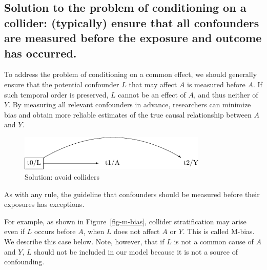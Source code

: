 \documentclass[
  singlecolumn]{report}
\begin{document}
\hypertarget{solution-to-the-problem-of-conditioning-on-a-collider-typically-ensure-that-all-confounders-are-measured-before-the-exposure-and-outcome-has-occurred.}{%
\subsection{Solution to the problem of conditioning on a collider:
(typically) ensure that all confounders are measured before the exposure
and outcome has
occurred.}\label{solution-to-the-problem-of-conditioning-on-a-collider-typically-ensure-that-all-confounders-are-measured-before-the-exposure-and-outcome-has-occurred.}}

To address the problem of conditioning on a common effect, we should
generally ensure that the potential confounder \(L\) that may affect
\(A\) is measured before \(A\). If such temporal order is preserved,
\(L\) cannot be an effect of \(A\), and thus neither of \(Y\). By
measuring all relevant confounders in advance, researchers can minimize
bias and obtain more reliable estimates of the true causal relationship
between \(A\) and \(Y\).

\begin{figure}

{\centering \includegraphics[width=0.8\textwidth,height=\textheight]{causal-dags_files/figure-pdf/fig-dag-common-effect-solution-1.pdf}

}

\caption{\label{fig-dag-common-effect-solution}Solution: avoid
colliders}

\end{figure}

As with any rule, the guideline that confounders should be measured
before their exposures has exceptions.

For example, as shown in Figure~\ref{fig-m-bias}, collider
stratification may arise even if \(L\) occurs before \(A\), when \(L\)
does not affect \(A\) or \(Y\). This is called M-bias. We describe this
case below. Note, however, that if \(L\) is not a common cause of \(A\)
and \(Y\), \(L\) should not be included in our model because it is not a
source of confounding.
\end{document}
